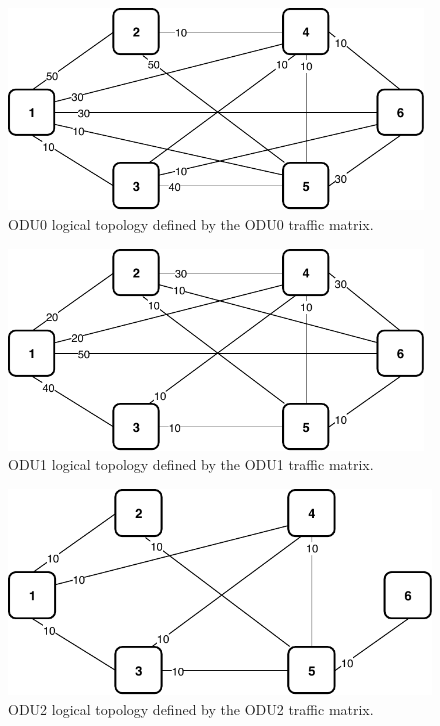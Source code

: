 \begin{figure}[h!]
\centering
\includegraphics[width=11cm]{sdf/ilp/opaque_protection/figures/logical_topology_ODU0_medium}
\caption{ODU0 logical topology defined by the ODU0 traffic matrix.}
\label{logical_ODU0_protectionmedium}
\end{figure}

\begin{figure}[h!]
\centering
\includegraphics[width=11cm]{sdf/ilp/opaque_protection/figures/logical_topology_ODU1_medium}
\caption{ODU1 logical topology defined by the ODU1 traffic matrix.}
\label{logical_ODU1_protectionmedium}
\end{figure}
\newpage
\begin{figure}[h!]
\centering
\includegraphics[width=12cm]{sdf/ilp/opaque_protection/figures/logical_topology_ODU2_medium}
\caption{ODU2 logical topology defined by the ODU2 traffic matrix.}
\label{logical_ODU2_protectionmedium}
\end{figure}

